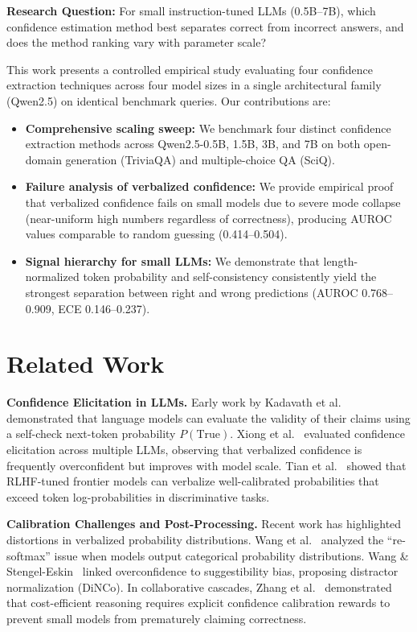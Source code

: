 \documentclass[10pt,twocolumn]{article}
\begin{document}
\textbf{Research Question:} For small instruction-tuned LLMs (0.5B--7B), which confidence estimation method best separates correct from incorrect answers, and does the method ranking vary with parameter scale?

This work presents a controlled empirical study evaluating four confidence extraction techniques across four model sizes in a single architectural family (Qwen2.5) on identical benchmark queries. Our contributions are:
\begin{itemize}
    \item \textbf{Comprehensive scaling sweep:} We benchmark four distinct confidence extraction methods across Qwen2.5-0.5B, 1.5B, 3B, and 7B on both open-domain generation (TriviaQA) and multiple-choice QA (SciQ).
    \item \textbf{Failure analysis of verbalized confidence:} We provide empirical proof that verbalized confidence fails on small models due to severe mode collapse (near-uniform high numbers regardless of correctness), producing AUROC values comparable to random guessing (0.414--0.504).
    \item \textbf{Signal hierarchy for small LLMs:} We demonstrate that length-normalized token probability and self-consistency consistently yield the strongest separation between right and wrong predictions (AUROC 0.768--0.909, ECE 0.146--0.237).
\end{itemize}

\section{Related Work}
\textbf{Confidence Elicitation in LLMs.} Early work by Kadavath et al.~\cite{kadavath2022language} demonstrated that language models can evaluate the validity of their claims using a self-check next-token probability $P(\text{True})$. Xiong et al.~\cite{xiong2023can} evaluated confidence elicitation across multiple LLMs, observing that verbalized confidence is frequently overconfident but improves with model scale. Tian et al.~\cite{tian2023just} showed that RLHF-tuned frontier models can verbalize well-calibrated probabilities that exceed token log-probabilities in discriminative tasks.

\textbf{Calibration Challenges and Post-Processing.} Recent work has highlighted distortions in verbalized probability distributions. Wang et al.~\cite{wang2024calibrating} analyzed the ``re-softmax'' issue when models output categorical probability distributions. Wang \& Stengel-Eskin~\cite{wang2025calibrating} linked overconfidence to suggestibility bias, proposing distractor normalization (DiNCo). In collaborative cascades, Zhang et al.~\cite{zhang2026confidence} demonstrated that cost-efficient reasoning requires explicit confidence calibration rewards to prevent small models from prematurely claiming correctness.
\end{document}
